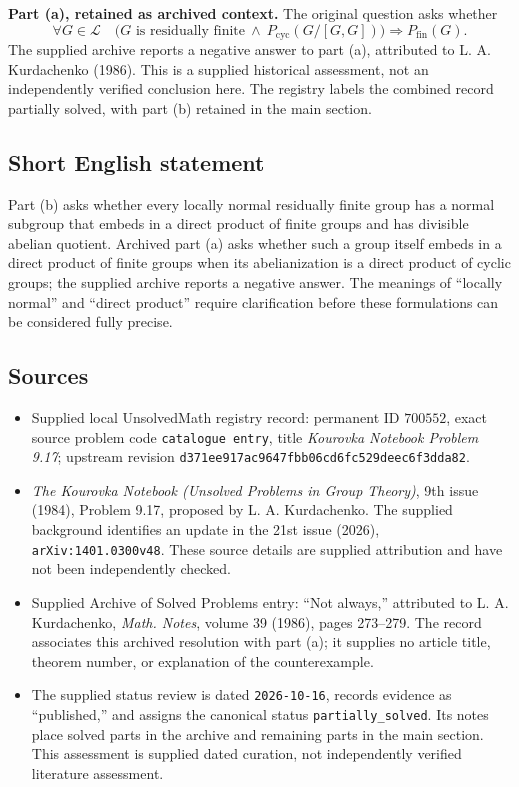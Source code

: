 \documentclass[11pt]{article}
\begin{document}
\textbf{Part (a), retained as archived context.} The original question asks whether
\[
\forall G\in\mathcal L\quad
\bigl(G\text{ is residually finite}\ \land\ P_{\mathrm{cyc}}(G/[G,G])\bigr)
\Longrightarrow P_{\mathrm{fin}}(G).
\]
The supplied archive reports a negative answer to part (a), attributed to L. A. Kurdachenko (1986). This is a supplied historical assessment, not an independently verified conclusion here. The registry labels the combined record partially solved, with part (b) retained in the main section.
\subsection{Short English statement}
Part (b) asks whether every locally normal residually finite group has a normal subgroup that embeds in a direct product of finite groups and has divisible abelian quotient. Archived part (a) asks whether such a group itself embeds in a direct product of finite groups when its abelianization is a direct product of cyclic groups; the supplied archive reports a negative answer. The meanings of ``locally normal'' and ``direct product'' require clarification before these formulations can be considered fully precise.
\subsection{Sources}
\begin{itemize}
\item Supplied local UnsolvedMath registry record: permanent ID \(700552\), exact source problem code \texttt{catalogue entry}, title \emph{Kourovka Notebook Problem 9.17}; upstream revision \texttt{d371ee917ac9647fbb06cd6fc529deec6f3dda82}.
\item \emph{The Kourovka Notebook (Unsolved Problems in Group Theory)}, 9th issue (1984), Problem 9.17, proposed by L. A. Kurdachenko. The supplied background identifies an update in the 21st issue (2026), \texttt{arXiv:1401.0300v48}. These source details are supplied attribution and have not been independently checked.
\item Supplied Archive of Solved Problems entry: ``Not always,'' attributed to L. A. Kurdachenko, \emph{Math. Notes}, volume 39 (1986), pages 273--279. The record associates this archived resolution with part (a); it supplies no article title, theorem number, or explanation of the counterexample.
\item The supplied status review is dated \texttt{2026-10-16}, records evidence as ``published,'' and assigns the canonical status \texttt{partially\_solved}. Its notes place solved parts in the archive and remaining parts in the main section. This assessment is supplied dated curation, not independently verified literature assessment.
\end{itemize}
\end{document}
